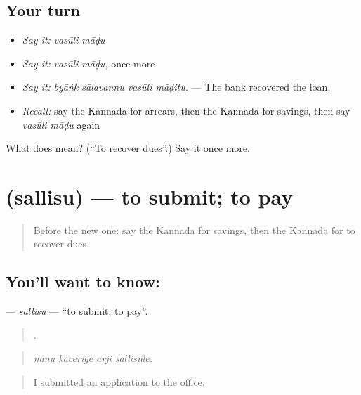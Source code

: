 \subsection*{Your turn}
\begin{itemize}
\raggedright
  \item \emph{Say it:} \emph{vasūli māḍu}
  \item \emph{Say it:} \emph{vasūli māḍu}, once more
  \item \emph{Say it:} \emph{byāṅk sālavannu vasūli māḍitu.} — The bank recovered the loan.
  \item \emph{Recall:} say the Kannada for arrears, then the Kannada for savings, then say \emph{vasūli māḍu} again
\end{itemize}

\begin{tcolorbox}[breakable,colback=teal!4,colframe=teal!35!black,title={Before you move on}]
What does   mean? (\textquotedblleft{}To recover dues\textquotedblright{}.) Say it once more.
\end{tcolorbox}
\section[\texorpdfstring{\kn{ಸಲ್ಲಿಸು} (sallisu)}{ಸಲ್ಲಿಸು (sallisu)}]{ (sallisu) — to submit; to pay}

\label{lesson:KA-C417-sallisu}



\begin{quote}
Before the new one: say the Kannada for savings, then the Kannada for to recover dues.
\end{quote}

\subsection*{You'll want to know: }
\textbf{} — \emph{sallisu} — \textquotedblleft{}to submit; to pay\textquotedblright{}.

\begin{quote}
   .
\end{quote}

\begin{quote}
\emph{nānu kacērige arji salliside.}
\end{quote}

\begin{quote}
I submitted an application to the office.
\end{quote}

